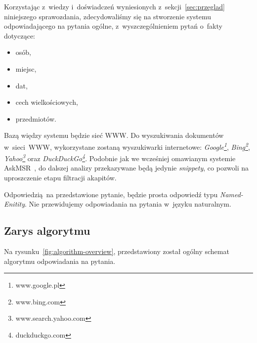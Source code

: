Korzystając z~wiedzy i~doświadczeń wyniesionych z~sekcji~\ref{sec:przeglad} niniejszego sprawozdania, zdecydowaliśmy się na stworzenie systemu odpowiadającego na pytania ogólne, z~wyszczególnieniem pytań o~fakty dotyczące:
\begin{itemize}
    \item osób,
    \item miejsc,
    \item dat,
    \item cech wielkościowych,
    \item przedmiotów.
\end{itemize}

Bazą więdzy systemu będzie sieć WWW. Do wyszukiwania dokumentów w~sieci~WWW, wykorzystane zostaną wyszukiwarki internetowe: \emph{Google\footnote{www.google.pl}}, \emph{Bing\footnote{www.bing.com}}, \emph{Yahoo\footnote{www.search.yahoo.com}} oraz \emph{DuckDuckGo\footnote{duckduckgo.com}}. Podobnie jak we wcześniej omawianym systemie AskMSR~\cite{brill2002analysis}, do dalszej analizy przekazywane będą jedynie \emph{snippety}, co pozwoli na uproszczenie etapu filtracji akapitów.

Odpowiedzią na przedstawione pytanie, będzie prosta odpowiedź typu \emph{Named-Enitity}. Nie przewidujemy odpowiadania na pytania w~języku naturalnym.

\subsection{Zarys algorytmu}

Na rysunku~\ref{fig:algorithm-overview}, przedstawiony został ogólny schemat algorytmu odpowiadania na pytania.

